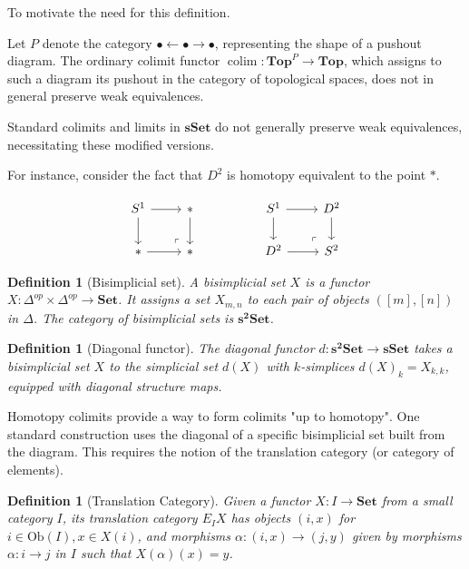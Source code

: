 \documentclass[12pt]{report}
\numberwithin{equation}{section}
\newtheorem{definition}[dummy]{Definition}
\begin{document}
	To motivate the need for this definition.
	
	Let $P$ denote the category $\bullet \leftarrow \bullet \rightarrow \bullet$, representing the shape of a pushout diagram. The ordinary colimit functor $\operatorname{colim} \colon \mathbf{Top}^P \to \mathbf{Top}$, which assigns to such a diagram its pushout in the category of topological spaces, does not in general preserve weak equivalences.
	
	Standard colimits and limits in $\mathbf{sSet}$ do not generally preserve weak equivalences, necessitating these modified versions.
	
	For instance, consider the fact that \( D^2 \) is homotopy equivalent to the point \( * \).
	
	\[\begin{tikzcd}
		{S^1} & {*} && {S^1} & {D^2} \\
		{*} & {*} && {D^2} & {S^2}
		\arrow[from=1-1, to=1-2]
		\arrow[from=1-1, to=2-1]
		\arrow[from=1-2, to=2-2]
		\arrow[from=1-4, to=1-5]
		\arrow[from=1-4, to=2-4]
		\arrow[from=1-5, to=2-5]
		\arrow[from=2-1, to=2-2]
		\arrow["\lrcorner"{anchor=center, pos=0.125, rotate=180}, draw=none, from=2-2, to=1-1]
		\arrow[from=2-4, to=2-5]
		\arrow["\lrcorner"{anchor=center, pos=0.125, rotate=180}, draw=none, from=2-5, to=1-4]
	\end{tikzcd}\]
	
	
	
	\begin{definition}[Bisimplicial set]
		A bisimplicial set $X$ is a functor $X: \Delta^{op} \times \Delta^{op} \to \mathbf{Set}$. It assigns a set $X_{m,n}$ to each pair of objects $([m], [n])$ in $\Delta$. The category of bisimplicial sets is $\mathbf{s^2Set}$.
	\end{definition}
	
	\begin{definition}[Diagonal functor]
		The diagonal functor $d: \mathbf{s^2Set} \to \mathbf{sSet}$ takes a bisimplicial set $X$ to the simplicial set $d(X)$ with $k$-simplices $d(X)_k = X_{k,k}$, equipped with diagonal structure maps.
	\end{definition}
	
	Homotopy colimits provide a way to form colimits "up to homotopy". One standard construction uses the diagonal of a specific bisimplicial set built from the diagram. This requires the notion of the translation category (or category of elements).
	
	\begin{definition}[Translation Category]
		Given a functor $X: I \to \mathbf{Set}$ from a small category $I$, its translation category $E_I X$ has objects $(i, x)$ for $i \in \mathrm{Ob}(I), x \in X(i)$, and morphisms $\alpha: (i, x) \to (j, y)$ given by morphisms $\alpha: i \to j$ in $I$ such that $X(\alpha)(x) = y$.
	\end{definition}
	
\end{document}
